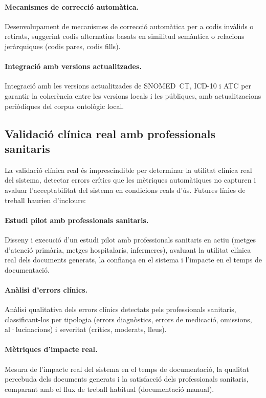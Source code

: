 \documentclass[CAT]{TFUOC}%
\begin{document}
\paragraph{Mecanismes de correcció automàtica.}
Desenvolupament de mecanismes de correcció automàtica per a codis invàlids o retirats, suggerint codis alternatius basats en similitud semàntica o relacions jeràrquiques (codis pares, codis fills).

\paragraph{Integració amb versions actualitzades.}
Integració amb les versions actualitzades de SNOMED~CT, ICD-10 i ATC per garantir la coherència entre les versions locals i les públiques, amb actualitzacions periòdiques del corpus ontològic local.

\subsection{Validació clínica real amb professionals sanitaris}

La validació clínica real és imprescindible per determinar la utilitat clínica real del sistema, detectar errors crítics que les mètriques automàtiques no capturen i avaluar l'acceptabilitat del sistema en condicions reals d'ús. Futures línies de treball haurien d'incloure:

\paragraph{Estudi pilot amb professionals sanitaris.}
Disseny i execució d'un estudi pilot amb professionals sanitaris en actiu (metges d'atenció primària, metges hospitalaris, infermeres), avaluant la utilitat clínica real dels documents generats, la confiança en el sistema i l'impacte en el temps de documentació.

\paragraph{Anàlisi d'errors clínics.}
Anàlisi qualitativa dels errors clínics detectats pels professionals sanitaris, classificant-los per tipologia (errors diagnòstics, errors de medicació, omissions, al·lucinacions) i severitat (crítics, moderats, lleus).

\paragraph{Mètriques d'impacte real.}
Mesura de l'impacte real del sistema en el temps de documentació, la qualitat percebuda dels documents generats i la satisfacció dels professionals sanitaris, comparant amb el flux de treball habitual (documentació manual).
\end{document}
